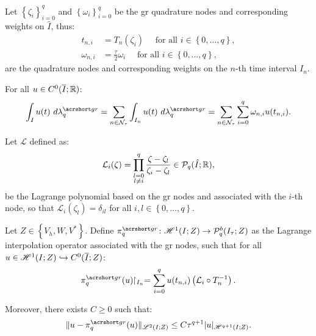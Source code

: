 Let $\left\{ \zeta_i \right\}_{i = 0}^{q}$ and $\left\{ \omega_i \right\}_{i = 0}^{q}$ be the \acrlong{gr} quadrature nodes and corresponding weights on $\hat{I}$, thus:
\begin{align}
    t_{n, i} &= T_n(\zeta_i) \quad \text{ for all } i \in \left\{ 0, \dots, q \right\}, \\
    \omega_{n, i} &= \frac{\tau}{2} \omega_i \quad \text{ for all } i \in \left\{ 0, \dots, q \right\},
\end{align}
are the quadrature nodes and corresponding weights on the $n$-th time interval $I_n$.

\begin{definition}[$\lambdaGR_q$]
    For all $u \in C^0(\overline{I}; \mathbb{R})$:
    \begin{gather}
        \int_I u(t) ~ d \lambdaGR_q = \sum_{n \in \TimeIndices} \int_{I_n} u(t) ~ d \lambdaGR_q = \sum_{n \in \TimeIndices} \sum_{i = 0}^q \omega_{n, i} u(t_{n, i}).
    \end{gather}
\end{definition}

\begin{definition}
    Let $\mathcal{L}$ defined as:
    \begin{gather}
        \mathcal{L}_i (\zeta) = \prod_{\substack{l = 0 \\ l \neq i}}^q \frac{\zeta - \zeta_l}{\zeta_i - \zeta_l} \in \mathcal{P}_{q}(\hat{I}; \mathbb{R}),
    \end{gather}
    be the Lagrange polynomial based on the \acrshort{gr} nodes and associated with the $i$-th node, so that $\mathcal{L}_i (\zeta_l) = \delta_{i l}$ for all $i, l \in \left\{ 0, \dots, q\right\}$.
\end{definition}

\begin{definition}[$\InterpolantGR_q$]
    Let $Z \in \left\{V_h, W, V^* \right\}$. Define $\InterpolantGR_q \colon \SpaceHk{1}(I; Z) \rightarrow \SpacePolynomials{q}^b(\TimeMesh; Z)$ as the Lagrange interpolation operator associated with the \acrshort{gr} nodes, such that for all $u \in \mathscr{H}^{1}(I; Z) \hookrightarrow C^0(\overline{I}; Z)$:
    \begin{gather}
        \InterpolantGR_q(u) \Restriction_{I_n} = \sum_{i = 0}^q u(t_{n, i}) \left( \mathcal{L}_i \circ T_n^{-1} \right).
    \end{gather}

    Moreover, there exists $C \geq 0$ such that:
    \begin{gather}
        \lVert u - \InterpolantGR_q(u) \rVert_{\SpaceLp{2}(I; Z)} \leq C \tau^{q + 1} \lvert u \rvert_{\SpaceHk{q + 1}(I; Z)}.
    \end{gather}
\end{definition}

